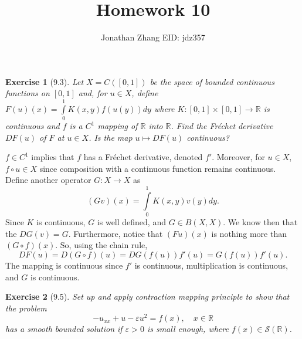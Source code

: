 \documentclass[letterpaper,twoside,11pt]{article}
\theoremstyle{mystyle}
\newtheorem*{exercise}{Exercise}
\newcommand{\R}{{\mathbb R}}
\newcommand{\cbk}{\color{black}}
\newcommand{\cblu}{\color{blue}}
\newcommand{\sch}{\mathcal S}
\begin{document}
\selectfont     %
\title{\vspace{-2\baselineskip} 
Homework 10
}
\author{Jonathan Zhang \qquad EID: { jdz357} }
\date{}
\maketitle


\begin{exercise}[9.3]
  Let $X = C([0,1])$ be the space of bounded continuous functions on $[0,1]$ and, for $u \in X$, define $F(u)(x) = \displaystyle\int\limits_0^1 K(x, y) f(u(y))dy$ where $K:[0,1] \times [0,1] \to \R$ is continuous and $f$ is a $C^1$ mapping of $\R$ into $\R$. Find the Fr\'echet derivative $DF(u)$ of $F$ at $u\in X$. Is the map $u \mapsto DF(u)$ continuous?
\end{exercise}

\cblu 
$f\in C^1$ implies that $f$ has a Fr\'echet derivative, denoted $f'$. Moreover, for $u \in X$, $f\circ u \in X$ since composition with a continuous function remains continuous. Define another operator $G : X \to X$ as 
\[(Gv)(x) = \int\limits_0^1 K(x,y) v(y) dy.\]
Since $K$ is continuous, $G$ is well defined, and $G \in B(X,X)$. We know then that the $DG(v) = G$. Furthermore, notice that $(Fu)(x)$ is nothing more than $(G \circ f)(x)$. So, using the chain rule, 
\[DF\left( u \right) = D\left( {G\circ f} \right)\left( u \right) = DG\left( {f\left( u \right)} \right)f'\left( u \right) = G\left( {f\left( u \right)} \right)f'\left( u \right).\]
The mapping is continuous since $f'$ is continuous, multiplication is continuous, and $G$ is continuous. 
\cbk 



\begin{exercise}[9.5]
  Set up and apply contraction mapping principle to show that the problem 
  \[-u_{xx} + u - \varepsilon u^2 = f(x), \quad x\in \R\]
  has a smooth bounded solution if $\varepsilon>0$ is small enough, where $f(x) \in \sch (\R)$. 
\end{exercise}
\end{document}
